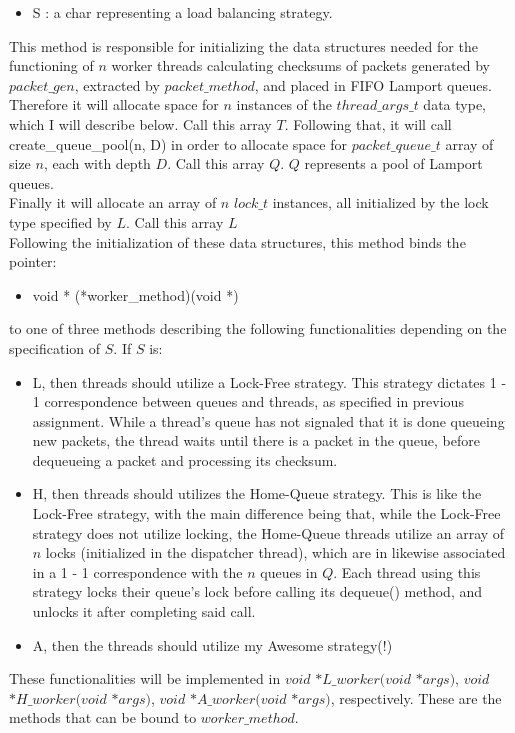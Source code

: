 \documentclass[]{article}
\begin{document}
\begin{itemize}
\begin{itemize}
\begin{itemize}
			\item S : a char representing a load balancing strategy.
		\end{itemize}
		This method is responsible for initializing the data structures needed for the functioning of $n$ worker threads calculating checksums of packets generated by  $packet\_gen$, extracted by $packet\_method$, and placed in FIFO Lamport queues.
		\\
		Therefore it will allocate space for $n$ instances of the $thread\_args\_t$ data type, which I will describe below. Call this array $T$.
		Following that, it will call create\_queue\_pool(n, D) in order to allocate space for $packet\_queue\_t$ array of size $n$, each with depth $D$. Call this array $Q$. $Q$ represents a pool of Lamport queues.
		\\
		Finally it will allocate an array of $n$ $lock\_t$ instances, all initialized by the lock type specified by $L$. Call this array $L$
		\\
		Following the initialization of these data structures, this method binds the pointer:
		\begin{itemize}
			\item void * (*worker\_method)(void *)
		\end{itemize} 
		to one of three methods describing the following functionalities depending on the specification of $S$. If $S$ is:
		\begin{itemize}
			\item L, then threads should utilize a Lock-Free strategy. This strategy dictates 1 - 1 correspondence between queues and threads, as specified in previous assignment. While a thread's queue has not signaled that it is done queueing new packets, the thread waits until there is a packet in the queue, before dequeueing a packet and processing its checksum. 
			\item H, then threads should utilizes the Home-Queue strategy. This is like the Lock-Free strategy, with the main difference being that, while the Lock-Free strategy does not utilize locking, the Home-Queue threads utilize an array of $n$ locks (initialized in the dispatcher thread), which are in likewise associated in a 1 - 1 correspondence with the $n$ queues in $Q$. Each thread using this strategy locks their queue's lock before calling its dequeue() method, and unlocks it after completing said call.
			\item A, then the threads should utilize my Awesome strategy(!)
		\end{itemize}
		These functionalities will be implemented in $void$ $*L\_worker(void$ $*args)$, $void$ $*H\_worker(void$ $*args)$, $void$ $*A\_worker(void$ $*args)$, respectively. These are the methods that can be bound to $worker\_method$.

\end{itemize}
\end{itemize}
\end{document}
